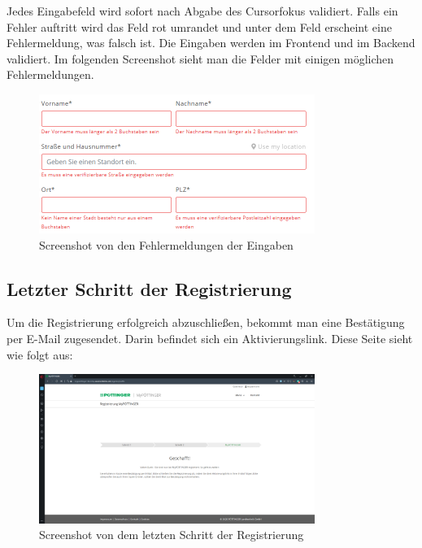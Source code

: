 Jedes Eingabefeld wird sofort nach Abgabe des Cursorfokus validiert. Falls ein Fehler auftritt wird das Feld rot umrandet und unter dem Feld erscheint eine Fehlermeldung, was falsch ist. Die Eingaben werden im Frontend und im Backend validiert. Im folgenden Screenshot sieht man die Felder mit einigen möglichen Fehlermeldungen.
\begin{figure}[H]
	\centerline{
		\includegraphics[width=0.8\textwidth]{./grafiken/dateneingabe_Errors.PNG}
	}
	\vskip0pt
	\caption{Screenshot von den Fehlermeldungen der Eingaben} \label{fig:eingabeError}
\end{figure}

\subsection{Letzter Schritt der Registrierung}
Um die Registrierung erfolgreich abzuschließen, bekommt man eine Bestätigung per E-Mail zugesendet. Darin befindet sich ein Aktivierungslink. Diese Seite sieht wie folgt aus:
\begin{figure}[H]
	\centerline{
		\includegraphics[width=0.8\textwidth]{./grafiken/erm_register_4.png}
	}
	\vskip0pt
	\caption{Screenshot von dem letzten Schritt der Registrierung} \label{fig:step3register}
\end{figure}

